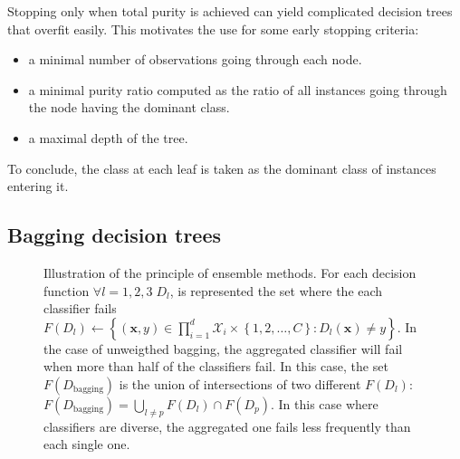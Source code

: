         Stopping only when total purity is achieved can yield complicated decision trees that overfit easily.
        This motivates the use for some early stopping criteria:
        \begin{itemize}
            \item a minimal number of observations going through each node.
            \item a minimal purity ratio computed as the ratio of all instances going through the node having the dominant class.
            \item a maximal depth of the tree.
        \end{itemize}
        To conclude, the class at each leaf is taken as the dominant class of instances entering it.

    \subsection{Bagging decision trees}
        \begin{figure}
            \centering
            
            \caption[
                Illustration of the principle of ensemble methods.
            ]{
                \label{fig::ensemble} Illustration of the principle of ensemble methods.
                For each decision function $\forall l=1,2,3\;D_l$, is represented the set where the each classifier fails $F(D_l) \leftarrow \left\{(\bm{x}, y) \in \prod_{i=1}^{d}\mathscr{X}_i \times \left\{1, 2, \dots, C\right\} : D_l(\bm{x}) \neq y\right\}$.
                In the case of unweigthed bagging, the aggregated classifier will fail when more than half of the classifiers fail.
                In this case, the set $F(D_{\text{bagging}})$ is the union of intersections of two different $F(D_l)$: $F(D_{\text{bagging}}) = \bigcup_{l\neq p} F(D_l) \cap F(D_p)$.
                In this case where classifiers are diverse, the aggregated one fails less frequently than each single one.
            }
        \end{figure}


